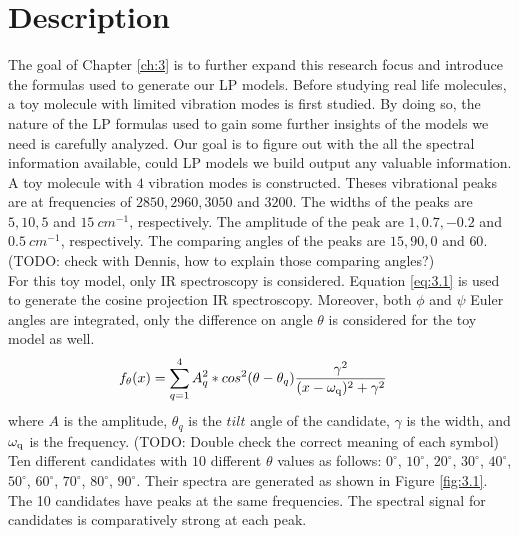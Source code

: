  \label{ch:3}

\section{Description}
The goal of Chapter \ref{ch:3} is to further expand this research focus and introduce the formulas used to generate our LP models. Before studying real life molecules, a toy molecule with limited vibration modes is first studied. By doing so, the nature of the LP formulas used to gain some further insights of the models we need is carefully analyzed. Our goal is to figure out with the all the spectral information available, could LP models we build output any valuable information. \\

A toy molecule with $4$ vibration modes is constructed. Theses vibrational peaks are at frequencies of $2850, 2960, 3050$ and $3200$. The widths of the peaks are $5, 10, 5$ and $15~cm^{-1}$, respectively. The amplitude of the peak are $1, 0.7, -0.2$ and $0.5~cm^{-1}$, respectively. The comparing angles of the peaks are $15, 90, 0$ and $60$. (TODO: check with Dennis, how to explain those comparing angles?)  \\

For this toy model, only IR spectroscopy is considered. Equation \ref{eq:3.1} is used to generate the cosine projection IR spectroscopy. Moreover, both $\phi$ and $\psi$ Euler angles are integrated, only the difference on angle $\theta$ is considered for the toy model as well. \\

\begin{eqnarray} \label{eq:3.1}
& f_{\theta}(x) = \displaystyle\sum^{4}_{q=1} A_q^2 * cos^2(\theta - \theta_q)\frac{\gamma^2}{(x- \omega_{\rm q})^2 + \gamma^2} 
\end{eqnarray}
where $A$ is the amplitude, $\theta_{q}$ is the $tilt$ angle of the candidate, $\gamma$ is the width, and $\omega_{\rm q}$ is the frequency. (TODO: Double check the correct meaning of each symbol) Ten different candidates with $10$ different $\theta$ values as follows: $0^{\circ}$, $10^{\circ}$, $20^{\circ}$, $30^{\circ}$, $40^{\circ}$, $50^{\circ}$, $60^{\circ}$, $70^{\circ}$, $80^{\circ}$, $90^{\circ}$. Their spectra are generated as shown in Figure \ref{fig:3.1}. The 10 candidates have peaks at the same frequencies. The spectral signal for candidates is comparatively strong at each peak. \\


